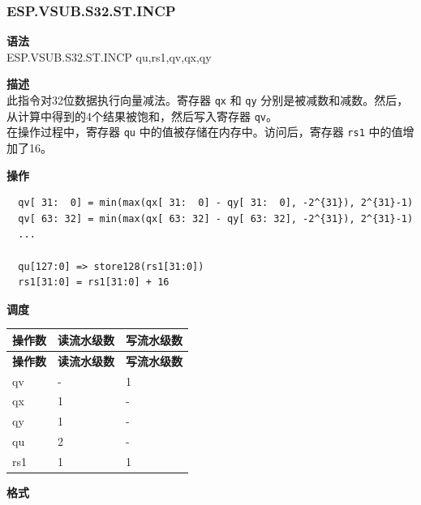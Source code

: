 \newpage
\subsubsection{ESP.VSUB.S32.ST.INCP}\label{instruction:ESPVSUBS32STINCP}
\textbf{语法}\\
ESP.VSUB.S32.ST.INCP qu,rs1,qv,qx,qy

\textbf{描述}\\
此指令对32位数据执行向量减法。寄存器 \lstinline{qx} 和 \lstinline{qy} 分别是被减数和减数。然后，从计算中得到的4个结果被饱和，然后写入寄存器 \lstinline{qv}。\\ 在操作过程中，寄存器 \lstinline{qu} 中的值被存储在内存中。访问后，寄存器 \lstinline{rs1} 中的值增加了16。

\textbf{操作}\\
\begin{lstlisting}
  qv[ 31:  0] = min(max(qx[ 31:  0] - qy[ 31:  0], -2^{31}), 2^{31}-1)
  qv[ 63: 32] = min(max(qx[ 63: 32] - qy[ 63: 32], -2^{31}), 2^{31}-1)
  ...

  qu[127:0] => store128(rs1[31:0])
  rs1[31:0] = rs1[31:0] + 16
\end{lstlisting}


\textbf{调度}\\
\begin{longtable}[c]{|l|l|l|}
    \hline
    \rowcolor{lightgray}
    \textbf{操作数} & \textbf{读流水级数} & \textbf{写流水级数} \\\hline
    \endfirsthead
    \hline
    \rowcolor{lightgray}
     \textbf{操作数} & \textbf{读流水级数} & \textbf{写流水级数} \\\hline
    \endhead
    \hline
    \endfoot

  qv & - & 1 \\\hline
    qx & 1 & - \\\hline
    qy & 1 & - \\\hline
    qu & 2 & - \\\hline
    rs1 & 1 & 1

\end{longtable}

\textbf{格式}\\

